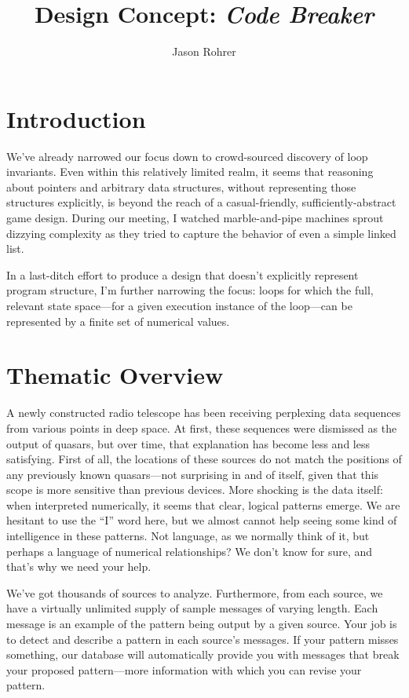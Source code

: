 \documentclass[12pt]{article}
\begin{document}
\title{Design Concept: {\it Code Breaker}}

\author{Jason Rohrer}

\maketitle

\section{Introduction}

We've already narrowed our focus down to crowd-sourced discovery of loop invariants.  Even within this relatively limited realm, it seems that reasoning about pointers and arbitrary data structures, without representing those structures explicitly, is beyond the reach of a casual-friendly, sufficiently-abstract game design.  During our meeting, I watched marble-and-pipe machines sprout dizzying complexity as they tried to capture the behavior of even a simple linked list.

In a last-ditch effort to produce a design that doesn't explicitly represent program structure, I'm further narrowing the focus:  loops for which the full, relevant state space---for a given execution instance of the loop---can be represented by a finite set of numerical values.

\section{Thematic Overview}

A newly constructed radio telescope has been receiving perplexing data sequences from various points in deep space.  At first, these sequences were dismissed as the output of quasars, but over time, that explanation has become less and less satisfying.  First of all, the locations of these sources do not match the positions of any previously known quasars---not surprising in and of itself, given that this scope is more sensitive than previous devices.  More shocking is the data itself:  when interpreted numerically, it seems that clear, logical patterns emerge.  We are hesitant to use the ``I'' word here, but we almost cannot help seeing some kind of intelligence in these patterns.  Not language, as we normally think of it, but perhaps a language of numerical relationships?  We don't know for sure, and that's why we need your help.

We've got thousands of sources to analyze.  Furthermore, from each source, we have a virtually unlimited supply of sample messages of varying length.  Each message is an example of the pattern being output by a given source.  Your job is to detect and describe a pattern in each source's messages.  If your pattern misses something, our database will automatically provide you with messages that break your proposed pattern---more information with which you can revise your pattern.
\end{document}
